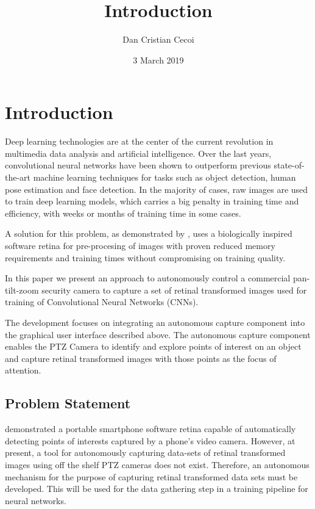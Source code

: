 \documentclass{l4proj}
\begin{document}

\title{Introduction}
\author{Dan Cristian Cecoi}
\date{3 March 2019}

\maketitle


\chapter{Introduction}

Deep learning technologies are at the center of the current revolution in multimedia data analysis and artificial intelligence. Over the last years, convolutional neural networks have been shown to outperform previous state-of-the-art machine learning techniques for tasks such as object detection, human pose estimation and face detection. In the majority of cases, raw images are used to train deep learning models, which carries a big penalty in training time and efficiency, with weeks or months of training time in some cases.

A solution for this problem, as demonstrated by \citet{Ozimek}, uses a biologically inspired software retina for pre-procesing of images with proven reduced memory requirements and training times without compromising on training quality. 

In this paper we present an approach to autonomously control a commercial pan-tilt-zoom security camera to capture a set of retinal transformed images used for training of Convolutional Neural Networks (CNNs). 

The development focuses on integrating an autonomous capture component into the graphical user interface described above. The autonomous capture component enables the PTZ Camera to identify and explore points of interest on an object and capture retinal transformed images with those points as the focus of attention. 

\section{Problem Statement}

 \citet{RyanWong} demonstrated a portable smartphone software retina capable of automatically detecting points of interests captured by a phone's video camera. However, at present, a tool for autonomously capturing data-sets of retinal transformed images using off the shelf PTZ cameras does not exist.
 Therefore, an autonomous mechanism for the purpose of capturing retinal transformed data sets must be developed. This will be used for the data gathering step in a training pipeline for neural networks. 
 
\end{document}
